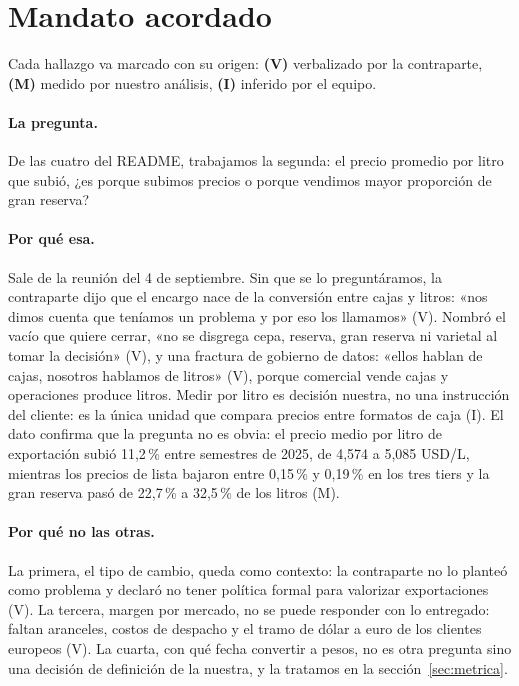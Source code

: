 
\section{Mandato acordado}
\label{sec:mandato}

Cada hallazgo va marcado con su origen: \textbf{(V)} verbalizado por la contraparte, \textbf{(M)} medido por nuestro análisis, \textbf{(I)} inferido por el equipo.

\paragraph{La pregunta.} De las cuatro del README, trabajamos la segunda: el precio promedio por litro que subió, ¿es porque subimos precios o porque vendimos mayor proporción de gran reserva?

\paragraph{Por qué esa.} Sale de la reunión del 4 de septiembre. Sin que se lo preguntáramos, la contraparte dijo que el encargo nace de la conversión entre cajas y litros: «nos dimos cuenta que teníamos un problema y por eso los llamamos» (V). Nombró el vacío que quiere cerrar, «no se disgrega cepa, reserva, gran reserva ni varietal al tomar la decisión» (V), y una fractura de gobierno de datos: «ellos hablan de cajas, nosotros hablamos de litros» (V), porque comercial vende cajas y operaciones produce litros. Medir por litro es decisión nuestra, no una instrucción del cliente: es la única unidad que compara precios entre formatos de caja (I). El dato confirma que la pregunta no es obvia: el precio medio por litro de exportación subió 11,2\,\% entre semestres de 2025, de 4,574 a 5,085 USD/L, mientras los precios de lista bajaron entre 0,15\,\% y 0,19\,\% en los tres tiers y la gran reserva pasó de 22,7\,\% a 32,5\,\% de los litros (M).

\paragraph{Por qué no las otras.} La primera, el tipo de cambio, queda como contexto: la contraparte no lo planteó como problema y declaró no tener política formal para valorizar exportaciones (V). La tercera, margen por mercado, no se puede responder con lo entregado: faltan aranceles, costos de despacho y el tramo de dólar a euro de los clientes europeos (V). La cuarta, con qué fecha convertir a pesos, no es otra pregunta sino una decisión de definición de la nuestra, y la tratamos en la sección~\ref{sec:metrica}.

